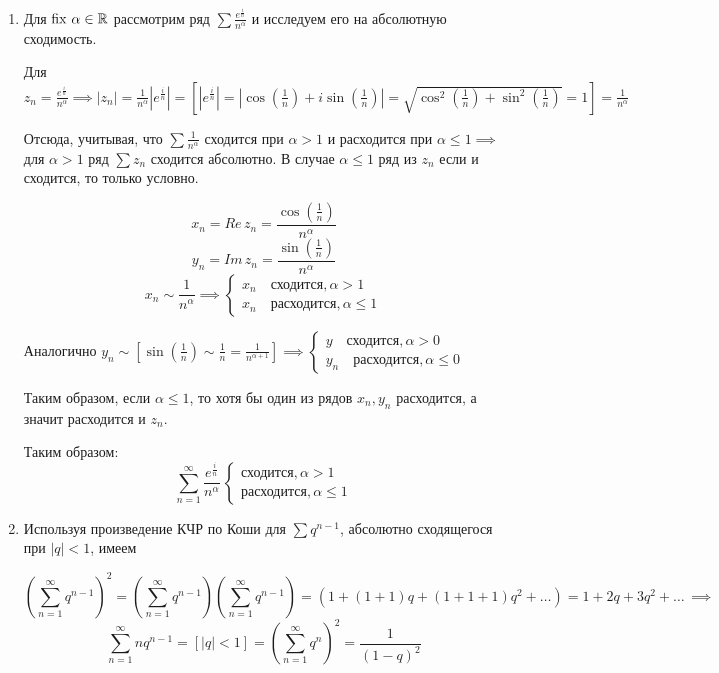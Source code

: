 \documentclass[../../main.tex]{subfiles}
\begin{document}
\begin{exmp}
	\;
	\begin{enumerate}
		\item Для $ \operatorname{fix}\, \alpha \in \mathbb{R} $ рассмотрим ряд $ \sum 
		\frac{e^{\frac{i}{n}}}{n^\alpha} $ и исследуем его на абсолютную сходимость.
		
		Для $ z_n = \frac{e^{\frac{i}{n}}}{n^\alpha} \implies |z_n| = 
		\frac{1}{n^\alpha} |e^{\frac{i}{n}}| = [|e^{\frac{i}{n}}| = 
		|\cos(\frac{1}{n}) + i\sin(\frac{1}{n})| = \sqrt{\cos^2(\frac{1}{n}) + 
		\sin^2(\frac{1}{n})} = 1] = \frac{1}{n^\alpha} $
		
		Отсюда, учитывая, что $ \sum \frac{1}{n^\alpha} $ сходится при $ \alpha > 1 
		$ и расходится при $ \alpha \leq 1 \implies $ для $ \alpha > 1 $ ряд $
		\sum z_n $ сходится абсолютно. В случае $ \alpha \leq 1 $ ряд из $ z_n $ 
		если и сходится, то только условно.
		
		\[x_n = Re\, z_n = \frac{\cos(\frac{1}{n})}{n^\alpha}\]
		\[y_n = Im\, z_n = \frac{\sin(\frac{1}{n})}{n^\alpha}\]
		\[x_n \sim \frac{1}{n^\alpha} \implies 
		\begin{cases}
			x_n \quad \text{сходится}, \alpha > 1 \\
			x_n \quad \text{расходится}, \alpha \leq 1
		\end{cases}\]
		
		Аналогично $ y_n \sim [\sin(\frac{1}{n}) \sim \frac{1}{n} = 
		\frac{1}{n^{\alpha + 1}}] \implies
		\begin{cases}
		y \quad \text{сходится}, \alpha > 0 \\
		y_n \quad \text{расходится}, \alpha \leq 0
		\end{cases} $
		
		Таким образом, если $ \alpha \leq 1 $, то хотя бы один из рядов $ x_n, y_n $ 
		расходится, а значит расходится и $ z_n $.
		
		Таким образом:
		\[ \sum_{n=1}^{\infty}\frac{e^{\frac{i}{n}}}{n^\alpha}\,
		\begin{cases}
		\text{сходится}, \alpha > 1 \\
		\text{расходится}, \alpha \leq 1
		\end{cases}\]
		
	\item Используя произведение КЧР по Коши для $ \sum q^{n - 1} $, абсолютно 
	сходящегося при $ |q| < 1 $, имеем
	
	\[(\sum_{n=1}^{\infty}q^{n - 1})^2 = (\sum_{n=1}^{\infty}q^{n - 
	1})(\sum_{n=1}^{\infty}q^{n - 1}) = (1 + (1 + 1)q + (1 + 1 + 1)q^2 + \ldots ) 
	= 1 + 2q + 3q^2 + \ldots\, \implies \]
	\[\sum_{n=1}^{\infty}nq^{n - 1} = [|q| < 1] = (\sum_{n=1}^{\infty}q^{n})^2 = 
	\frac{1}{(1 - q)^2}\]
	\end{enumerate}
\end{exmp}
\end{document}

